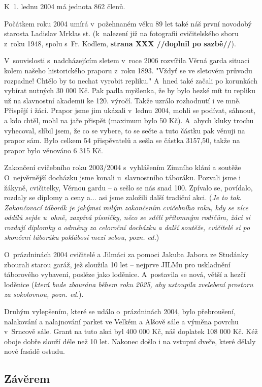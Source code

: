 \documentclass[a5paper, 11pt, twoside]{article}
\begin{document}
K~1. lednu 2004 má jednota 862 členů.

Počátkem roku 2004 umírá v~požehnaném věku 89 let také náš první
novodobý starosta Ladislav Mrklas st. (k~nalezení již na fotografii
cvičitelského sboru z~roku 1948, spolu s~Fr. Kodlem, \textbf{strana XXX
//doplnil po sazbě//}).

V~souvislosti s~nadcházejícím sletem v~roce 2006 rozvířila Věrná garda
situaci kolem našeho historického praporu z~roku 1893. "Vždyť se ve
sletovém průvodu rozpadne! Chtělo by to nechat vyrobit repliku." A~hned
také začali po korunkách vybírat nutných 30 000 Kč. Pak padla myšlenka,
že by bylo hezké mít tu repliku už na slavnostní akademii ke 120.
výročí. Takže uzrálo rozhodnutí i ve mně. Přispějí i žáci. Prapor jsme
jim ukázali v~lednu 2004, mohli se podívat, sáhnout, a kdo chtěl, mohl
na jaře přispět (maximum bylo 50 Kč). A~abych kluky trochu vyhecoval,
slíbil jsem, že co se vybere, to se sečte a tuto částku pak věnuji na
prapor sám. Bylo celkem 54 přispěvatelů a sešla se částka 3157,50, takže
na prapor bylo věnováno 6 315 Kč.

Zakončení cvičebního roku 2003/2004 s~vyhlášením Zimního klání a soutěže
O~nejvěrnější docházku jsme konali u~slavnostního táboráku. Pozvali jsme
i žákyně, cvičitelky, Věrnou gardu -- a sešlo se nás snad 100. Zpívalo
se, povídalo, rozdaly se diplomy a ceny a... asi jsme založili další
tradiční akci. (\textit{Je to tak. Zakončovací táborák je jakýmsi milým
zakončením cvičebního roku, kdy se více oddílů sejde u~ohně, zazpívá
písničky, něco se sdělí přítomným rodičům, žáci si rozdají diplomky a
odměny za celoroční docházku a další soutěže, cvičitelé si po skončení
táboráku poklábosí mezi sebou, pozn. ed.})

O~prázdninách 2004 cvičitelé a Jilmáci za pomoci Jakuba Jabora ze
Studánky zbourali starou garáž, jež sloužila 10 let -- nejprve JILMu pro
uskladnění táborového vybavení, posléze jako loděnice. A~postavila se
nová, větší a hezčí loděnice (\textit{která bude zbourána během roku 2025,
aby ustoupila zvelebení prostoru za sokolovnou, pozn. ed.}).

Druhým vylepšením, které se událo o~prázdninách 2004, bylo přebroušení,
nalakování a nalajnování parket ve Velkém a Alšově sále a výměna povrchu
v~Srncově sále. Grant na tuto akci byl 400 000 Kč, náš doplatek 108 000
Kč. Kéž oboje dobře slouží déle než 10 let. Nakonec došlo i na vstupní
dveře, které dělaly nové fasádě ostudu.

\subsection{Závěrem}
\end{document}
